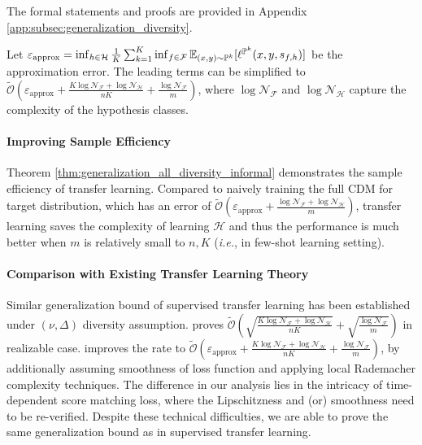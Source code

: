 \documentclass[11pt]{article}
\numberwithin{equation}{section}
\renewcommand{\P}{\mathbb{P}}
\begin{document}
The formal statements and proofs are provided in Appendix \ref{app:subsec:generalization_diversity}.

Let $\varepsilon_{\text{approx}}=\inf_{h\in\mathcal{H}} \frac{1}{K}\sum_{k=1}^K \inf_{f\in\mathcal{F}}\E_{(x,y)\sim\P^k} [\ell^{\P^k} (x,y,s_{f,h})]$ be the approximation error.
The leading terms can be simplified to $\widetilde{\mathcal{O}}\left(\varepsilon_{\text{approx}}+\frac{K\log\mathcal{N}_\mathcal{F}+\log\mathcal{N}_\mathcal{H}}{nK}+\frac{\log\mathcal{N}_\mathcal{F}}{m}\right)$, where $\log\mathcal{N}_\mathcal{F}$ and $\log\mathcal{N}_\mathcal{H}$ capture the complexity of the hypothesis classes.

\paragraph{Improving Sample Efficiency}
Theorem \ref{thm:generalization_all_diversity_informal} demonstrates the sample efficiency of transfer learning. 
Compared to naively training the full CDM for target distribution, which has an error of $\widetilde{\mathcal{O}}\left(\varepsilon_{\text{approx}}+\frac{\log\mathcal{N}_\mathcal{F}+\log\mathcal{N}_\mathcal{H}}{m}\right)$, transfer learning saves the complexity of learning $\mathcal{H}$ and thus the performance is much better when $m$ is relatively small to $n,K$ (\textit{i.e.}, in few-shot learning setting). 

\paragraph{Comparison with Existing Transfer Learning Theory}
Similar generalization bound of supervised transfer learning has been established under $(\nu,\Delta)$ diversity assumption.
\citet{tripuraneni2020theory} proves $\widetilde{\mathcal{O}}\left(\sqrt{\frac{K\log\mathcal{N}_\mathcal{F}+\log\mathcal{N}_\mathcal{H}}{nK}}+\sqrt{\frac{\log\mathcal{N}_\mathcal{F}}{m}}\right)
$ in realizable case.
\citet{watkins2023optimistic} improves the rate to $\widetilde{\mathcal{O}}\left(\varepsilon_{\text{approx}}+\frac{K\log\mathcal{N}_\mathcal{F}+\log\mathcal{N}_\mathcal{H}}{nK}+\frac{\log\mathcal{N}_\mathcal{F}}{m}\right)
$, by additionally assuming smoothness of loss function and applying local Rademacher complexity techniques.
The difference in our analysis lies in the intricacy of time-dependent score matching loss, where the Lipschitzness and (or) smoothness need to be re-verified.
Despite these technical difficulties, we are able to prove the same generalization bound as in supervised transfer learning. 
\end{document}
